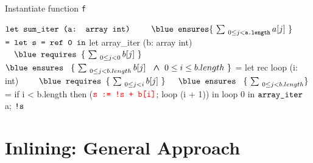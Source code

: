 \begin{frame}[fragile]
{Instantiate function \texttt{f}}
\begin{footnotesize}
\begin{minipage}[t]{0.3\linewidth}
\begin{whycode} 
   $\color{black}\texttt{let sum\_iter (a: array int)}$
	$\hspace*{2em}\color{black}\texttt{\blue ensures}\{~\sum_{~0 \leq j < \texttt{a.length}} a[j]~\}$
   $\color{black}\texttt{=  let s = ref 0 in}$
      let array_iter (b: array int)
	      $\\ \hspace*{1em}\texttt{\blue requires }\{\Noir{~\sum_{~0 \leq j < 0} b[j]~}\} $
        $\\ \hspace*{0em}\texttt{\blue ensures  }~\{\Noir{~\sum_{~0 \leq j < b.length} b[j]}~\bwedge 0 \leq i \leq b.length~\}$ 
      = let rec loop (i: int)
	      $\\ \hspace*{2em}\texttt{\blue requires }\{\Noir{~\sum_{~0 \leq j < i} b[j]~}\} $
        $\\ \hspace*{1em}\texttt{\blue ensures  }~\{\Noir{~\sum_{~0 \leq j < b.length}}\}$
        = if i < b.length 
          then (${\color{red}\texttt{s := !s + b[i]}}$; loop (i + 1)) 
        in loop 0   
      in ${\color{black}\texttt{array\_iter}}$ a;
     ${\color{black}\texttt{!s}}$
\end{whycode}
\end{minipage}
\end{footnotesize}
\end{frame}

\section*{Inlining: General Approach}
